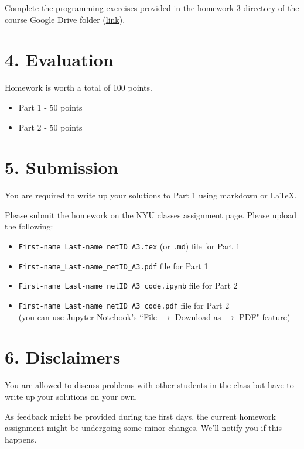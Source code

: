 \documentclass[12pt,letterpaper]{article}
\newcommand\hwnumber{3}                  %
\begin{document}
\noindent Complete the programming exercises provided in the homework $\hwnumber$ directory of the course Google Drive folder (\href{https://drive.google.com/drive/folders/1afl1U32OooudxiiFxqzLAN1xpznfKgCz?usp=sharing}{link}).

\section*{4. Evaluation}
Homework is worth a total of 100 points.
\begin{itemize}
    \item Part 1 - 50 points
    \item Part 2 - 50 points
\end{itemize}


\section*{5. Submission}
You are required to write up your solutions to Part 1 using markdown or \LaTeX.

Please submit the homework on the NYU classes assignment page. Please upload the following:
\begin{itemize}
    \item \texttt{First-name\_Last-name\_netID\_A3.tex} (or \texttt{.md}) file for Part 1
    \item \texttt{First-name\_Last-name\_netID\_A3.pdf} file for Part 1
    \item \texttt{First-name\_Last-name\_netID\_A3\_code.ipynb} file for Part 2
    \item 
    \texttt{First-name\_Last-name\_netID\_A3\_code.pdf} file for Part 2\\
    (you can use Jupyter Notebook's ``File $\to$ Download as $\to$ PDF" feature)
\end{itemize}

\section*{6. Disclaimers}
You are allowed to discuss problems with other students in the class but have to write up your solutions on your own. 

As feedback might be provided during the first days, the current homework assignment might be undergoing some minor changes. We'll notify you if this happens.
\end{document}

